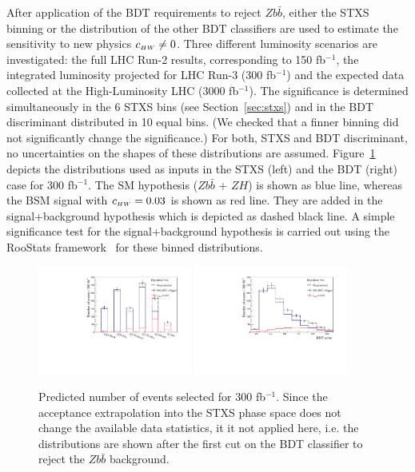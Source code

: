 After application of the BDT requirements to reject $Z b\bar{b}$, either the STXS binning or the distribution of the other BDT classifiers are used to estimate the sensitivity to new physics $c_{\scriptscriptstyle HW} \neq 0$. Three different luminosity scenarios are investigated: the full LHC Run-2 results, corresponding to 150 fb$^{-1}$, the integrated luminosity projected for LHC Run-3 (300 fb$^{-1}$) and the expected data collected at the High-Luminosity LHC (3000 fb$^{-1}$). The significance is determined simultaneously in the 6 STXS bins (see Section~\ref{sec:stxs}) and in the BDT discriminant distributed in 10 equal bins. (We checked that a finner binning did not significantly change the significance.) For both, STXS and BDT discriminant, no uncertainties on the shapes of these distributions are assumed. Figure~\ref{fig:hypotest} depicts the distributions used as inputs in the STXS (left) and the BDT (right) case for 300 fb$^{-1}$. The SM hypothesis ($Z b\bar{b}$ + $ZH$) is shown as blue line, whereas the BSM signal with $c_{\scriptscriptstyle HW} = 0.03$ is shown as red line. They are added in the signal+background hypothesis which is depicted as dashed black line. A simple significance test for the signal+background hypothesis is carried out using the {\sc RooStats} framework~\cite{Moneta:2010pm} for these binned distributions.
 
\begin{figure}[htb]
\centering
      \includegraphics[width=0.45\textwidth]{plots/HypoTest_STXS.pdf}
      \includegraphics[width=0.45\textwidth]{plots/HypoTest_BDT.pdf}
      \caption{Predicted number of events selected for 300 fb$^{-1}$. Since the acceptance extrapolation into the STXS phase space does not change the available data statistics, it it not applied here, i.e. the distributions are shown after the first cut on the BDT classifier to reject the $Z b\bar{b}$ background.}
\label{fig:hypotest}
\end{figure}

